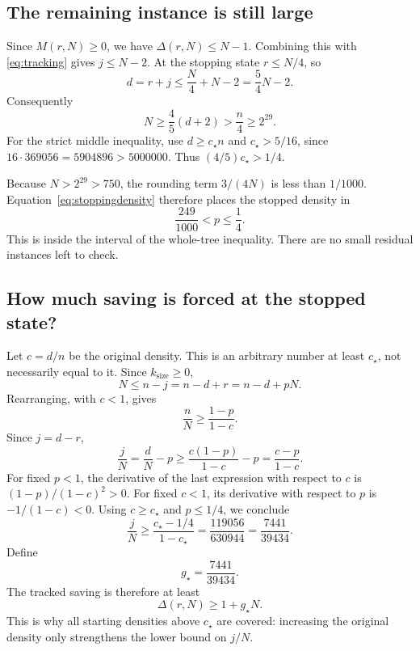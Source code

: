 \documentclass[11pt]{article}
\theoremstyle{definition}
\theoremstyle{remark}
\newcommand{\cstar}{c_\star}
\numberwithin{equation}{section}
\begin{document}
\subsection{The remaining instance is still large}

Since \(M(r,N)\ge0\), we have \(\Delta(r,N)\le N-1\).
Combining this with \eqref{eq:tracking} gives \(j\le N-2\).
At the stopping state \(r\le N/4\), so
\[
 d=r+j\le\frac N4+N-2=\frac54N-2.
\]
Consequently
\begin{equation}\label{eq:remaining-size}
 N\ge\frac45(d+2)>\frac n4\ge2^{29}.
\end{equation}
For the strict middle inequality, use \(d\ge\cstar n\) and
\(\cstar>5/16\), since
\(16\cdot369056=5904896>5000000\).
Thus \((4/5)\cstar>1/4\).

Because \(N>2^{29}>750\), the rounding term \(3/(4N)\) is less
than \(1/1000\). Equation~\eqref{eq:stoppingdensity} therefore
places the stopped density in
\[
 \frac{249}{1000}<p\le\frac14.
\]
This is inside the interval of the whole-tree inequality.
There are no small residual instances left to check.

\subsection{How much saving is forced at the stopped state?}

Let \(c=d/n\) be the original density. This is an arbitrary number
at least \(\cstar\), not necessarily equal to it.
Since \(k_{\mathrm{size}}\ge0\),
\[
 N\le n-j=n-d+r=n-d+pN.
\]
Rearranging, with \(c<1\), gives
\[
 \frac nN\ge\frac{1-p}{1-c}.
\]
Since \(j=d-r\),
\begin{equation}\label{eq:rankmoves}
 \frac jN=\frac dN-p
 \ge\frac{c(1-p)}{1-c}-p
 =\frac{c-p}{1-c}.
\end{equation}
For fixed \(p<1\), the derivative of the last expression with
respect to \(c\) is \((1-p)/(1-c)^2>0\).
For fixed \(c<1\), its derivative with respect to \(p\) is
\(-1/(1-c)<0\).
Using \(c\ge\cstar\) and \(p\le1/4\), we conclude
\[
 \frac jN\ge
 \frac{\cstar-1/4}{1-\cstar}
 =\frac{119056}{630944}
 =\frac{7441}{39434}.
\]
Define
\begin{equation}\label{eq:gstar}
 g_\star=\frac{7441}{39434}.
\end{equation}
The tracked saving is therefore at least
\begin{equation}\label{eq:lower-saving}
 \Delta(r,N)\ge1+g_\star N.
\end{equation}
This is why all starting densities above \(\cstar\) are covered:
increasing the original density only strengthens the lower bound
on \(j/N\).
\end{document}
